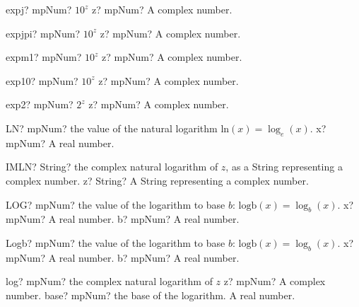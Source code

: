 \documentclass[12pt,a4paper,openany]{book}
\begin{document}
\begin{mpFunctionsExtract}
\mpFunctionOne
{expj? mpNum?  $10^z$}
{z? mpNum? A complex number.}
\end{mpFunctionsExtract}

\begin{mpFunctionsExtract}
\mpFunctionOne
{expjpi? mpNum?  $10^z$}
{z? mpNum? A complex number.}
\end{mpFunctionsExtract}

\begin{mpFunctionsExtract}
\mpFunctionOne
{expm1? mpNum?  $10^z$}
{z? mpNum? A complex number.}
\end{mpFunctionsExtract}

\begin{mpFunctionsExtract}
\mpFunctionOne
{exp10? mpNum?  $10^z$}
{z? mpNum? A complex number.}
\end{mpFunctionsExtract}

\begin{mpFunctionsExtract}
\mpFunctionOne
{exp2? mpNum?  $2^z$}
{z? mpNum? A complex number.}
\end{mpFunctionsExtract}

\begin{mpFunctionsExtract}
\mpWorksheetFunctionOneNotImplemented
{LN? mpNum? the value of the natural logarithm $\text{ln}(x) = \log_e(x)$.}
{x? mpNum? A real number.}
\end{mpFunctionsExtract}

\begin{mpFunctionsExtract}
\mpWorksheetFunctionOneNotImplemented
{IMLN? String? the complex natural logarithm of $z$, as a String representing a complex number.}
{z? String? A String representing a complex number.}
\end{mpFunctionsExtract}

\begin{mpFunctionsExtract}
\mpWorksheetFunctionTwoNotImplemented
{LOG? mpNum? the value of the logarithm  to base $b$: $\text{logb}(x) = \log_{b}(x)$.}
{x? mpNum? A real number.}
{b? mpNum? A real number.}
\end{mpFunctionsExtract}

\begin{mpFunctionsExtract}
\mpFunctionTwo
{Logb? mpNum? the value of the logarithm  to base $b$: $\text{logb}(x) = \log_{b}(x)$.}
{x? mpNum? A real number.}
{b? mpNum? A real number.}
\end{mpFunctionsExtract}

\begin{mpFunctionsExtract}
\mpFunctionTwo
{log? mpNum? the complex natural logarithm of $z$}
{z? mpNum? A complex number.}
{base? mpNum? the base of the logarithm. A real number.}
\end{mpFunctionsExtract}
\end{document}
